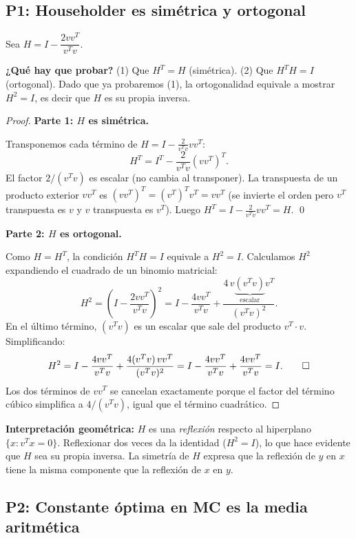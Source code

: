 \documentclass[11pt,a4paper]{article}
\begin{document}
\subsection{P1: Householder es simétrica y ortogonal}
\label{sec:q2_2016_p1}

Sea $H = I - \dfrac{2vv^T}{v^Tv}$.

\textbf{¿Qué hay que probar?} (1) Que $H^T = H$ (simétrica). (2) Que $H^TH = I$ (ortogonal). Dado que ya probaremos (1), la ortogonalidad equivale a mostrar $H^2 = I$, es decir que $H$ es su propia inversa.

\begin{proof}
\textbf{Parte 1: $H$ es simétrica.}

Transponemos cada término de $H = I - \frac{2}{v^Tv}vv^T$:
\[
  H^T = I^T - \frac{2}{v^Tv}(vv^T)^T.
\]
El factor $2/(v^Tv)$ es escalar (no cambia al transponer). La transpuesta de un producto exterior $vv^T$ es $(vv^T)^T = (v^T)^Tv^T = vv^T$ (se invierte el orden pero $v^T$ transpuesta es $v$ y $v$ transpuesta es $v^T$). Luego $H^T = I - \frac{2}{v^Tv}vv^T = H$. \qed

\textbf{Parte 2: $H$ es ortogonal.}

Como $H = H^T$, la condición $H^TH = I$ equivale a $H^2 = I$. Calculamos $H^2$ expandiendo el cuadrado de un binomio matricial:
\[
  H^2 = \left(I - \frac{2vv^T}{v^Tv}\right)^2
      = I - \frac{4vv^T}{v^Tv} + \frac{4\,v\underbrace{(v^Tv)}_{\text{escalar}}v^T}{(v^Tv)^2}.
\]
En el último término, $(v^Tv)$ es un escalar que sale del producto $v^T\cdot v$. Simplificando:
\[
  H^2 = I - \frac{4vv^T}{v^Tv} + \frac{4(v^Tv)\,vv^T}{(v^Tv)^2}
      = I - \frac{4vv^T}{v^Tv} + \frac{4vv^T}{v^Tv} = I. \qed
\]
Los dos términos de $vv^T$ se cancelan exactamente porque el factor del término cúbico simplifica a $4/(v^Tv)$, igual que el término cuadrático.
\end{proof}

\begin{tcolorbox}[info]
\textbf{Interpretación geométrica:} $H$ es una \emph{reflexión} respecto al hiperplano $\{x : v^Tx=0\}$. Reflexionar dos veces da la identidad ($H^2=I$), lo que hace evidente que $H$ sea su propia inversa. La simetría de $H$ expresa que la reflexión de $y$ en $x$ tiene la misma componente que la reflexión de $x$ en $y$.
\end{tcolorbox}

\subsection{P2: Constante óptima en MC es la media aritmética}
\label{sec:q2_2016_p2}
\end{document}
